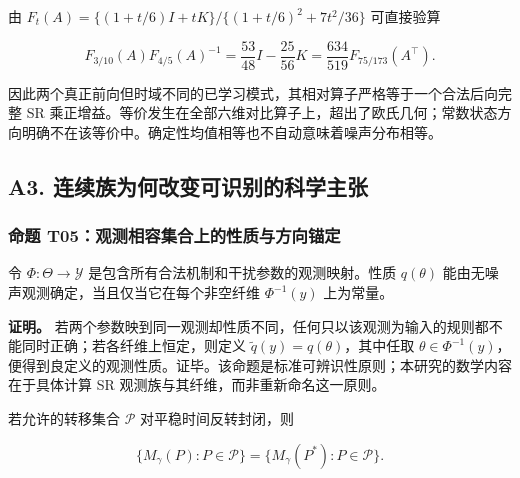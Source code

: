 \documentclass[11pt,a4paper]{article}
\begin{document}
\par
\noindent\begin{minipage}{\linewidth}

由 \(F_t(A)=\{(1+t/6)I+tK\}/\{(1+t/6)^2+7t^2/36\}\) 可直接验算

\[
F_{3/10}(A)F_{4/5}(A)^{-1}
=\frac{53}{48}I-\frac{25}{56}K
=\frac{634}{519}F_{75/173}(A^\top).
\]

\end{minipage}\par

因此两个真正前向但时域不同的已学习模式，其相对算子严格等于一个合法后向完整
SR
乘正增益。等价发生在全部六维对比算子上，超出了欧氏几何；常数状态方向明确不在该等价中。确定性均值相等也不自动意味着噪声分布相等。

\subsection{A3.
连续族为何改变可识别的科学主张}\label{a3.-ux8fdeux7eedux65cfux4e3aux4f55ux6539ux53d8ux53efux8bc6ux522bux7684ux79d1ux5b66ux4e3bux5f20}

\subsubsection{命题
T05：观测相容集合上的性质与方向锚定}\label{ux547dux9898-t05ux89c2ux6d4bux76f8ux5bb9ux96c6ux5408ux4e0aux7684ux6027ux8d28ux4e0eux65b9ux5411ux951aux5b9a}

令 \(\Phi:\Theta\to\mathcal Y\)
是包含所有合法机制和干扰参数的观测映射。性质 \(q(\theta)\)
能由无噪声观测确定，当且仅当它在每个非空纤维 \(\Phi^{-1}(y)\) 上为常量。

\textbf{证明。}
若两个参数映到同一观测却性质不同，任何只以该观测为输入的规则都不能同时正确；若各纤维上恒定，则定义
\(\widetilde q(y)=q(\theta)\)，其中任取
\(\theta\in\Phi^{-1}(y)\)，便得到良定义的观测性质。证毕。该命题是标准可辨识性原则；本研究的数学内容在于具体计算
SR 观测族与其纤维，而非重新命名这一原则。

\par
\noindent\begin{minipage}{\linewidth}

若允许的转移集合 \(\mathcal P\) 对平稳时间反转封闭，则

\[
\{M_\gamma(P):P\in\mathcal P\}
=\{M_\gamma(P^*):P\in\mathcal P\}.
\]

\end{minipage}\par
\end{document}
